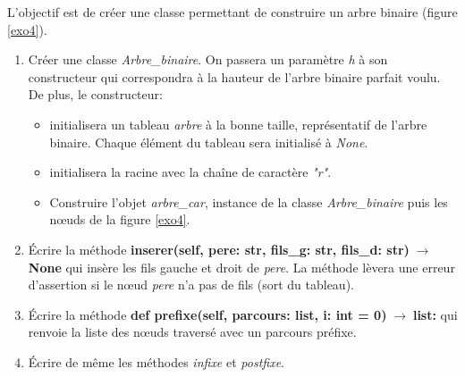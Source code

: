 \documentclass[a4paper,11pt]{article}
\begin{document}
\begin{Form}
\begin{exo}
\begin{center}
\label{exo4}
\end{center}
L'objectif est de créer une classe permettant de construire un arbre binaire (figure \ref{exo4}).
\begin{enumerate}
\item Créer une classe \emph{Arbre\_binaire}. On passera un paramètre \emph{h} à son constructeur qui correspondra à la hauteur de l'arbre binaire parfait voulu. De plus, le constructeur:
\begin{itemize}
\item initialisera un tableau \emph{arbre} à la bonne taille, représentatif de l'arbre binaire. Chaque élément du tableau sera initialisé à \emph{None}.
\item initialisera la racine avec la chaîne de caractère \emph{"r"}. 
\item Construire l'objet \emph{arbre\_car}, instance de la classe \emph{Arbre\_binaire} puis les nœuds de la figure \ref{exo4}.
\end{itemize}
\item Écrire la méthode \textbf{inserer(self, pere: str, fils\_g: str, fils\_d: str)$\;\rightarrow\;$None} qui insère les fils gauche et droit de \emph{pere}. La méthode lèvera une erreur d'assertion si le nœud \emph{pere} n'a pas de fils (sort du tableau).
\item Écrire la méthode \textbf{def prefixe(self, parcours: list, i: int = 0)$\;\rightarrow\;$list:} qui renvoie la liste des nœuds traversé avec un parcours préfixe.
\item Écrire de même les méthodes \emph{infixe} et \emph{postfixe}.
\end{enumerate}
\end{exo}
\end{Form}
\end{document}

